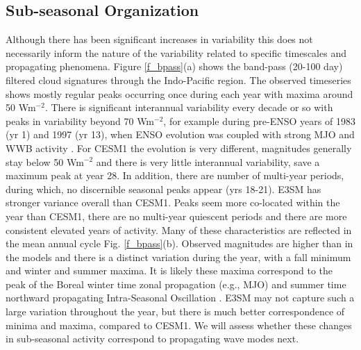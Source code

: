 \documentclass[draft,ms]{AGUTeX}
\begin{document}
\begin{article}
\section{Sub-seasonal Organization}
\label{sec:waves}

Although there has been significant increases in variability this does not necessarily inform the nature of the variability related to specific timescales and propagating phenomena. Figure \ref{f_bpass}(a) shows the band-pass (20-100 day) filtered cloud signatures through the Indo-Pacific region. The observed timeseries shows mostly regular peaks occurring once during each year with maxima around 50 Wm$^{-2}$. There is significant interannual variability every decade or so with peaks in variability beyond 70 Wm$^{-2}$, for example during pre-ENSO years of 1983 (yr 1) and 1997 (yr 13), when ENSO evolution was coupled with strong MJO and WWB activity \cite[e.g.,][]{Lengaigne2003}. For CESM1 the evolution is very different, magnitudes generally stay below 50 Wm$^{-2}$ and there is very little interannual variability, save a maximum peak at year 28. In addition, there are number of multi-year periods, during which, no discernible seasonal peaks appear (yrs 18-21). E3SM has stronger variance overall than CESM1. Peaks seem more co-located within the year than CESM1, there are no multi-year quiescent periods and there are more consistent elevated years of activity. Many of these characteristics are reflected in the mean annual cycle Fig. \ref{f_bpass}(b). Observed magnitudes are higher than in the models and there is a distinct variation during the year, with a fall minimum and winter and summer maxima. It is likely these maxima correspond to the peak of the Boreal winter time zonal propagation (e.g., MJO) and summer time northward propagating Intra-Seasonal Oscillation \citep[ISO, ][]{Krishnamurti1982}. E3SM may not capture such a large variation throughout the year, but there is much better correspondence of minima and maxima, compared to CESM1. We will assess whether these changes in sub-seasonal activity correspond to propagating wave modes next.


\end{article}
\end{document}
